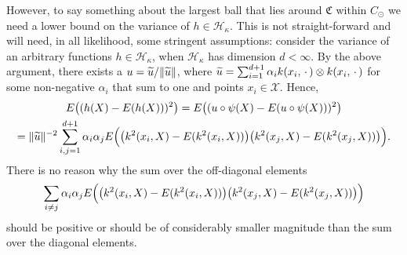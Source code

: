 \documentclass[10pt]{amsart}
\theoremstyle{definition}\newtheorem{defi}[theo]{Definition}\newtheorem{rema}[theo]{Remark}\newtheorem{exam}[theo]{Example}\newtheorem{exem}[theo]{Example}\newtheorem{nota}[theo]{Notation}
\theoremstyle{remark}
\newcommand{\X}{\mathcal{X}}
\newcommand{\cH}{\mathcal{H}}
\newcommand{\fkC}{\mathfrak{C}}
\let\oldtilde\tilde
\renewcommand*{\tilde}[1]{\mathchoice{\widetilde{#1}}{\widetilde{#1}}{\oldtilde{#1}}{\oldtilde{#1}}}
\begin{document}
However, to say something about the largest ball that lies around $\fkC$ within $C_\odot$ we need a lower bound on the variance of $h \in \cH_\kappa$. This is not straight-forward and will need, in all likelihood, some stringent assumptions: consider the variance of an arbitrary functions $h \in \cH_\kappa$, when $\cH_\kappa$ has dimension $d < \infty$. By the above argument, there exists a $u = \tilde u / \|\tilde u\|$, where $\tilde u = \sum_{i=1}^{d+1} \alpha_i k(x_i,\,\cdot\,) \otimes k(x_i,\,\cdot\,)$ for some non-negative $\alpha_i$ that sum to one and points $x_i \in \X$. Hence,
\begin{multline*}
E\bigl((h(X) - E(h(X)))^2\bigr) = E\bigl((u \circ \psi(X) - E(u \circ \psi(X)))^2\bigr) \\
= \|\tilde u\|^{-2} \sum_{i,j=1}^{d+1} \alpha_i \alpha_j E\Bigl(\bigl(k^2(x_i,X) - E(k^2(x_i,X))\bigr)\bigl(k^2(x_j,X) - E(k^2(x_j,X))\bigr)\Bigr).
\end{multline*}
There is no reason why the sum over the off-diagonal elements
\[
\sum_{i\not =j} \alpha_i \alpha_j E\Bigl(\bigl(k^2(x_i,X) - E(k^2(x_i,X))\bigr)\bigl(k^2(x_j,X) - E(k^2(x_j,X))\bigr)\Bigr)
\]
should be positive or should be of considerably smaller magnitude than the sum over the diagonal elements.
\end{document}
